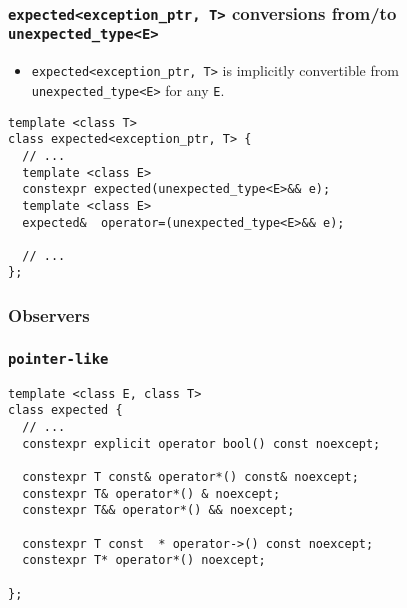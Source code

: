 \documentclass[xcolor=dvipsnames]{beamer}
\newcommand{\cpp}[1]{\lstinline{#1}}
\begin{document}
\begin{frame}[fragile]
\frametitle{\cpp{expected<exception_ptr, T>} conversions from/to \cpp{unexpected_type<E>}}

\begin{itemize}
\item \cpp{expected<exception_ptr, T>} is implicitly convertible from \cpp{unexpected_type<E>}  for any \cpp{E}.
\end{itemize}

\begin{lstlisting}
template <class T>
class expected<exception_ptr, T> {
  // ...
  template <class E>
  constexpr expected(unexpected_type<E>&& e);
  template <class E>
  expected&  operator=(unexpected_type<E>&& e);

  // ...  
};
\end{lstlisting}

\end{frame}
\subsubsection{Observers}
\begin{frame}[fragile]
\frametitle{\cpp{pointer-like}}

\begin{lstlisting}
template <class E, class T>
class expected {
  // ...
  constexpr explicit operator bool() const noexcept;

  constexpr T const& operator*() const& noexcept;
  constexpr T& operator*() & noexcept; 
  constexpr T&& operator*() && noexcept; 

  constexpr T const  * operator->() const noexcept;
  constexpr T* operator*() noexcept; 
  
};
\end{lstlisting}

\end{frame}
\end{document}
